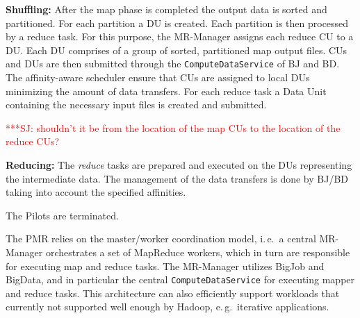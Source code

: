 \documentclass{acm_proc_article-sp}
\newcommand{\jhanote}[1]{ {\textcolor{red} { ***SJ: #1 }}}
\newcommand{\alnote}[1]{ {\textcolor{blue} { ***andreL: #1 }}}
\newcommand{\pnote}[1]{ {\textcolor{magenta} { ***pradeep: #1 }}}
\newcommand{\alnote}[1]{}
\newcommand{\pnote}[1]{}
\newcommand{\jhanote}[1]{}
\newcommand{\upp}{\vspace*{-0.5em}}
\newcommand{\pilots}{Pilots\xspace}
\newcommand{\mrmg}{MR-Manager\xspace}
\newcommand{\cus}{CUs\xspace}
\newcommand{\du}{DU\xspace}
\newcommand{\dus}{DUs\xspace}
\begin{document}
\begin{compactenum}[A.]
\item \textbf{Shuffling:} %
  After the map phase is completed the output data is sorted and
  partitioned. For each partition a \du is created. Each partition is
  then processed by a reduce task. For this purpose, the \mrmg assigns
  each reduce CU to a DU. Each DU comprises of a group of sorted,
  partitioned map output files. \cus and \dus are then submitted
  through the \texttt{ComputeDataService} of BJ and BD. The
  affinity-aware scheduler ensure that \cus are assigned to local \dus
  minimizing the amount of data transfers.  For each reduce task a
  Data Unit containing the necessary input files is created and
  submitted. %

\jhanote{shouldn't it
    be from the location of the map CUs to the location of the reduce
    CUs?} 
		
	
\item \textbf{Reducing:} The {\it reduce} tasks are prepared and
  executed on the DUs representing the intermediate data.
  The management of the data transfers is done by BJ/BD taking into account the 
  specified affinities.
	
\item The \pilots are terminated.

\end{compactenum}
\upp
The PMR relies on the master/worker coordination model, i.\,e.\ a
central \mrmg orchestrates a set of MapReduce workers, which in turn
are responsible for executing map and reduce tasks. The \mrmg utilizes
BigJob and BigData, and in particular the central
\texttt{ComputeDataService} for executing mapper and reduce tasks.
This architecture can also efficiently support workloads that
currently not supported well enough by Hadoop, e.\,g.\ iterative
applications.
\end{document}
